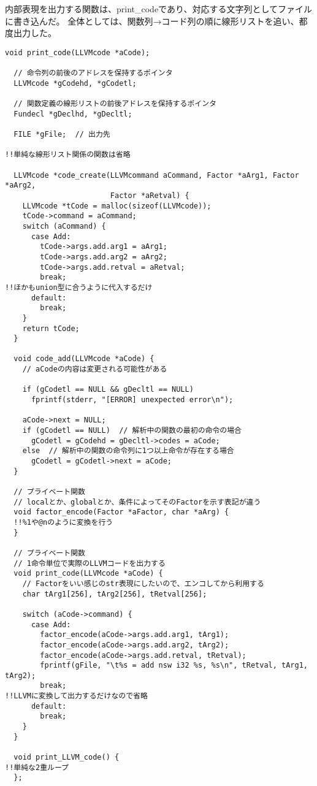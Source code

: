 内部表現を出力する関数は、print\_codeであり、対応する文字列としてファイルに書き込んだ。
全体としては、関数列→コード列の順に線形リストを追い、都度出力した。
\begin{lstlisting}[caption={llvm.c},label={llvm.c}]
  void print_code(LLVMcode *aCode);
  
  // 命令列の前後のアドレスを保持するポインタ
  LLVMcode *gCodehd, *gCodetl;
  
  // 関数定義の線形リストの前後アドレスを保持するポインタ
  Fundecl *gDeclhd, *gDecltl;
  
  FILE *gFile;  // 出力先

!!単純な線形リスト関係の関数は省略

  LLVMcode *code_create(LLVMcommand aCommand, Factor *aArg1, Factor *aArg2,
                        Factor *aRetval) {
    LLVMcode *tCode = malloc(sizeof(LLVMcode));
    tCode->command = aCommand;
    switch (aCommand) {
      case Add:
        tCode->args.add.arg1 = aArg1;
        tCode->args.add.arg2 = aArg2;
        tCode->args.add.retval = aRetval;
        break;
!!ほかもunion型に合うように代入するだけ
      default:
        break;
    }
    return tCode;
  }
  
  void code_add(LLVMcode *aCode) {
    // aCodeの内容は変更される可能性がある
  
    if (gCodetl == NULL && gDecltl == NULL)
      fprintf(stderr, "[ERROR] unexpected error\n");
  
    aCode->next = NULL;
    if (gCodetl == NULL)  // 解析中の関数の最初の命令の場合
      gCodetl = gCodehd = gDecltl->codes = aCode;
    else  // 解析中の関数の命令列に1つ以上命令が存在する場合
      gCodetl = gCodetl->next = aCode;
  }
  
  // プライベート関数
  // localとか、globalとか、条件によってそのFactorを示す表記が違う
  void factor_encode(Factor *aFactor, char *aArg) {
  !!%1や@nのように変換を行う
  }
  
  // プライベート関数
  // 1命令単位で実際のLLVMコードを出力する
  void print_code(LLVMcode *aCode) {
    // Factorをいい感じのstr表現にしたいので、エンコしてから利用する
    char tArg1[256], tArg2[256], tRetval[256];
  
    switch (aCode->command) {
      case Add:
        factor_encode(aCode->args.add.arg1, tArg1);
        factor_encode(aCode->args.add.arg2, tArg2);
        factor_encode(aCode->args.add.retval, tRetval);
        fprintf(gFile, "\t%s = add nsw i32 %s, %s\n", tRetval, tArg1, tArg2);
        break;
!!LLVMに変換して出力するだけなので省略
      default:
        break;
    }
  }
  
  void print_LLVM_code() {
!!単純な2重ループ
  };
\end{lstlisting}

